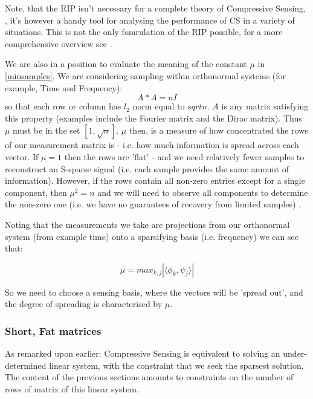 Note, that the RIP isn't necessary for a complete theory of Compressive Sensing, \cite{candes2011probabilistic}, it's however a handy tool for analysing the performance of CS in a variety of situations. This is not the only fomrulation of the RIP possible, for a more comprehensive overview see \cite{foucart2013mathematical}.

We are also in a position to evaluate the meaning of the constant \(\mu\) in \ref{minsamples}. We are considering sampling within orthonormal systems (for example, Time and Frequency):
%
\begin{equation}
A*A = nI
\end{equation}
\label{orthonormal}
%
so that each row or column has \(l_2\) norm equal to \(sqrt{n}\). \(A\) is any matrix satisfying this property (examples include the Fourier matrix and the Dirac matrix). Thus \(\mu\) must be in the set \(\left[1, \sqrt{n}\right]\). \(\mu\) then, is a measure of how concentrated the rows of our measurement matrix is - i.e. how much information is spread across each vector. If \(\mu = 1\) then the rows are 'flat' -  and we need relatively fewer samples to reconstruct an S-sparse signal (i.e. each sample provides the same amount of information). However, if the rows contain all non-zero entries except for a single component, then \(\mu^2 = n\) and we will need to observe all components to determine the non-zero one (i.e. we have no guarantees of recovery from limited samples) \cite{Candes2007}. 

Noting that the measurements we take are projections from our orthonormal system (from example time) onto a sparsifying basis (i.e. frequency) we can see that:

\begin{equation}
\mu = max_{k,j} |\langle \phi_k, \psi_j \rangle |
\end{equation}
\label {mudef}
 
So we need to choose a sensing basis, where the vectors will be 'spread out', and the degree of spreading is characterised by \(\mu\).

\subsubsection{Short, Fat matrices}
As remarked upon earlier: Compressive Sensing is equivalent to solving an under-determined linear system, with the constraint that we seek the sparsest solution. The content of the previous sections amounts to constraints on the number of rows of matrix of this linear system. 

